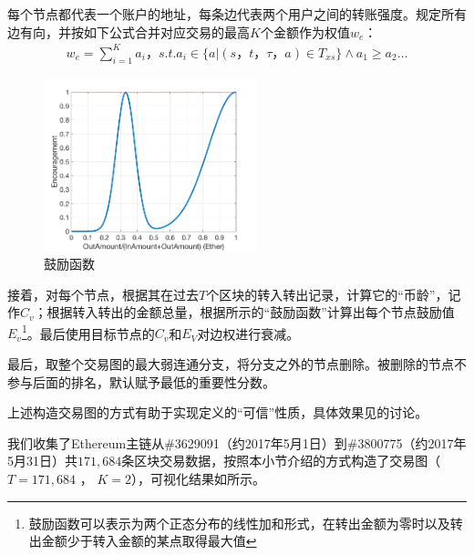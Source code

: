 每个节点都代表一个账户的地址，每条边代表两个用户之间的转账强度。规定所有边有向，并按如下公式合并对应交易的最高$K$个金额作为权值$w_e$：
\begin{align}\label{formula:edgeweight}
w_e = \sum_{i=1}^K a_i， s.t. a_i \in \{a|(s，t，\tau，a) \in T_{xs} \} \land a_1 \geq a_2 \dots
\end{align}

\begin{figure}[h]
\centering
	\includegraphics[width=0.55\textwidth]{figs/encouragement_en.png}
	\caption{鼓励函数}\label{fig:encouragement}
\end{figure}

接着，对每个节点，根据其在过去$T$个区块的转入转出记录，计算它的“币龄”，记作$C_v$；根据转入转出的金额总量，根据所示的“鼓励函数”计算出每个节点鼓励值$E_v$\footnote{鼓励函数可以表示为两个正态分布的线性加和形式，在转出金额为零时以及转出金额少于转入金额的某点取得最大值}。最后使用目标节点的$C_v$和$E_V$对边权进行衰减。

最后，取整个交易图的最大弱连通分支，将分支之外的节点删除。被删除的节点不参与后面的排名，默认赋予最低的重要性分数。

上述构造交易图的方式有助于实现定义的“可信”性质，具体效果见的讨论。

我们收集了Ethereum主链从\#3629091（约2017年5月1日）到\#3800775（约2017年5月31日）共$171,684$条区块交易数据，按照本小节介绍的方式构造了交易图（$T=171,684$ ， $K=2$），可视化结果如所示。


